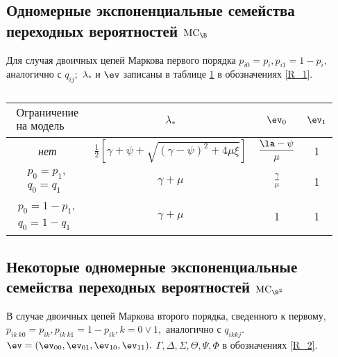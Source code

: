 \subsection{Одномерные экспоненциальные семейства переходных вероятностей $\mathrm{MC}_\B$}

Для случая двоичных цепей Маркова первого порядка $p_{i0} = p_{i}, p_{i1} = 1 - p_{i},$ аналогично с $q_{ij};$ $\lambda_\ast$ и $\ev$ записаны в таблице \ref{tab:tableFIRST} в обозначениях \eqref{R_1}.
 
\begin{table}[h!]
  \begin{center}
    \caption{ }
    \label{tab:tableFIRST}
    \begin{tabular}{c|c|c|c}
     \toprule %
       $\begin{array}{c}
      \textrm{Ограничение}\\
      \textrm{на модель}
      \end{array}$ & $\lambda_\ast$ & ${\ev}_0$ & ${\ev}_1$\\
      \toprule
      \textit{нет} & $\displaystyle \frac{1}{2} \left[ \gamma + \psi + \sqrt{(\gamma - \psi)^2 + 4 \mu \xi} \right]$ & $\displaystyle \frac{\la - \psi}{\mu} $ & 1\\
\midrule
      $\begin{array}{l}
      p_0 = p_1,\\
      q_0 = q_1
      \end{array}$ & $\gamma + \mu$ & $ \displaystyle \frac{\gamma}{\mu}$ & 1\\
\midrule
      $\begin{array}{l}
      p_0 = 1 - p_1,\\
      q_0 = 1 - q_1
      \end{array}$ & $\gamma + \mu$ & 1 & 1\\
\bottomrule
    \end{tabular}
  \end{center}
\end{table}

\subsection{Некоторые одномерные экспоненциальные семейства переходных вероятностей $\mathrm{MC}_{\B^2}$}
\label{EXP_FAM_SECOND}

В случае двоичных цепей Маркова второго порядка, сведенного к первому, $p_{ik \ k0} = p_{ik}, p_{ik \ k1} = 1 - p_{ik}, k = 0 \vee 1,$ аналогично с $q_{ik kj}.$ $\ev = ({\ev}_{00}, {\ev}_{01}, {\ev}_{10}, {\ev}_{11}).$ $\Gamma, \Delta, \Sigma, \Theta, \Psi, \Phi$ в обозначениях \eqref{R_2}.

